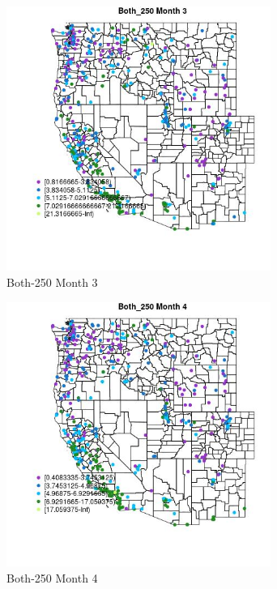 \begin{figure} 
\centering  
\includegraphics[width=0.77\textwidth]{Code_Outputs/ML_input_report_ML_input_PM25_Step5_part_d_de_duplicated_aves_ML_input_MapObsMo3Both_250.jpg} 
\caption{\label{fig:ML_input_report_ML_input_PM25_Step5_part_d_de_duplicated_aves_ML_inputMapObsMo3Both_250}Both-250 Month 3} 
\end{figure} 
 

\begin{figure} 
\centering  
\includegraphics[width=0.77\textwidth]{Code_Outputs/ML_input_report_ML_input_PM25_Step5_part_d_de_duplicated_aves_ML_input_MapObsMo4Both_250.jpg} 
\caption{\label{fig:ML_input_report_ML_input_PM25_Step5_part_d_de_duplicated_aves_ML_inputMapObsMo4Both_250}Both-250 Month 4} 
\end{figure} 
 


